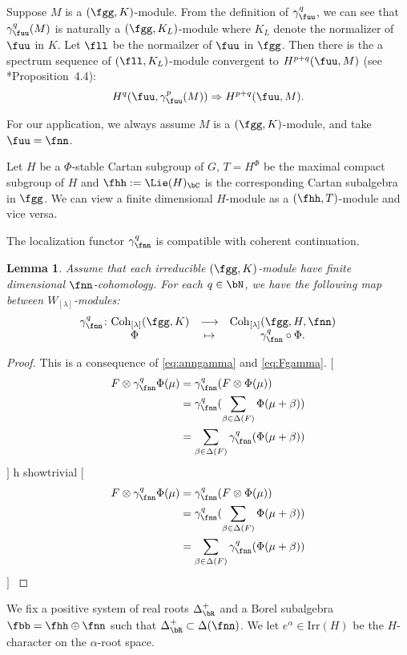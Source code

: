 \documentclass[12pt,a4paper]{amsart}
\newcommand{\trivial}[2][]{\if\relax\detokenize{#1}\relax
  {%
      \color{orange} \vspace{0em} $[$  #2 $]$
      \color{black}
  }
  \else
\ifx#1h
\ifcsname showtrivial\endcsname
{%
    \color{orange} \vspace{0em}  $[$ #2 $]$
    \color{black}
}
\fi
\else {\red Wrong argument!} \fi
\fi
}
\numberwithin{equation}{section}
\newtheorem{lem}[thm]{Lemma}
\theoremstyle{remark}
\def\Irr{\mathrm{Irr}}
\def\WT#1{\Delta(#1)}
\def\Wlam{W_{[\lambda]}}
\def\Coh{\mathrm{Coh}}
\begin{document}
Suppose $M$ is a $(\fgg,K)$-module. From the definition of $\gamma_{\fuu}^{q}$,
we can see that $\gamma_{\fuu}^{q}(M)$ is naturally a $(\fgg, K_{L})$-module
where $K_{L}$ denote the normalizer of $\fuu$ in $K$. Let $\fll$ be the
normailzer of $\fuu$ in $\fgg$. Then there is the a spectrum sequence of
$(\fll,K_{L})$-module convergent to $H^{p+q}(\fuu,M)$ (see
\cite{Cas}*{Proposition~4.4}):
\begin{equation}\label{eq:ugamma}
  H^{q}(\fuu,\gamma_{\fuu}^{p}(M)) \Rightarrow H^{p+q}(\fuu,M).
\end{equation}

For our application, we always assume $M$ is a $(\fgg,K)$-module, and take
$\fuu=\fnn$.

Let $H$ be a $\Phi$-stable Cartan subgroup of $G$, $T=H^{\Phi}$ be the
maximal compact subgroup of $H$ and $\fhh:=\Lie(H)_{\bC}$ is the corresponding
Cartan subalgebra in $\fgg$. We can view a finite dimensional $H$-module as a
$(\fhh,T)$-module and vice versa.

The localization functor $\gamma_{\fnn}^{q}$ is compatible with coherent
continuation.
\begin{lem}\label{lem:coh.gamma}
  Assume that each irreducible $(\fgg,K)$-module have finite dimensional
  $\fnn$-cohomology. For each $q\in \bN$, we have the following map between
  $\Wlam$-modules:
  \[
    \begin{array}{ccc}
      \gamma_{\fnn}^{q}\colon \Coh_{[\lambda]}(\fgg,K)
      &\longrightarrow
      & \Coh_{[\lambda]}(\fgg,H,\fnn) \\
      \Phi & \mapsto & \gamma_{\fnn}^{q}\circ \Phi.
    \end{array}
  \]
\end{lem}
\begin{proof}
  This is a consequence of \eqref{eq:anngamma} and \eqref{eq:Fgamma}. \trivial[]{
    \[
      \begin{split}
        F\otimes \gamma_{\fnn}^q\Phi(\mu) & =
        \gamma_{\fnn}^{q}(F\otimes \Phi(\mu))\\
        &= \gamma_{\fnn}^{q}(\sum_{\beta\in \WT{F}} \Phi(\mu+\beta))\\
        &= \sum_{\beta\in \WT{F}}\gamma_{\fnn}^{q}( \Phi(\mu+\beta))\\
      \end{split}
    \]
  }
\end{proof}

We fix a positive system of real roots $\Delta^{+}_{\bR}$ and a Borel subalgebra
$\fbb=\fhh\oplus \fnn$ such that $\Delta^{+}_{\bR}\subset \WT{\fnn}$. We let
$e^{\alpha}\in \Irr(H)$ be the $H$-character on the $\alpha$-root space.
\end{document}
